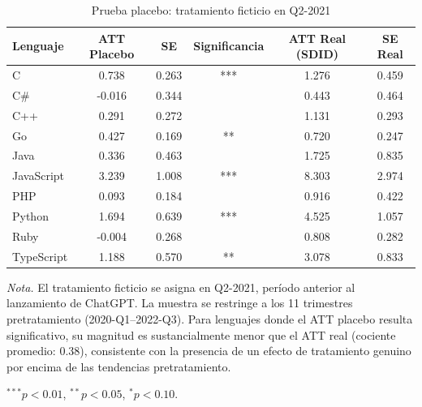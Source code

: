 \begin{table}[H]
\centering
\begin{threeparttable}
\caption{Prueba placebo: tratamiento ficticio en Q2-2021}
\label{tab:tabla5}
\begin{tabular}{lccccc}
\toprule
Lenguaje & ATT Placebo & SE & Significancia & ATT Real (SDID) & SE Real \\
\midrule
C & 0.738 & 0.263 & *** & 1.276 & 0.459 \\
C\# & -0.016 & 0.344 &  & 0.443 & 0.464 \\
C++ & 0.291 & 0.272 &  & 1.131 & 0.293 \\
Go & 0.427 & 0.169 & ** & 0.720 & 0.247 \\
Java & 0.336 & 0.463 &  & 1.725 & 0.835 \\
JavaScript & 3.239 & 1.008 & *** & 8.303 & 2.974 \\
PHP & 0.093 & 0.184 &  & 0.916 & 0.422 \\
Python & 1.694 & 0.639 & *** & 4.525 & 1.057 \\
Ruby & -0.004 & 0.268 &  & 0.808 & 0.282 \\
TypeScript & 1.188 & 0.570 & ** & 3.078 & 0.833 \\
\bottomrule
\end{tabular}
\begin{tablenotes}
\small
\item \textit{Nota.} El tratamiento ficticio se asigna en Q2-2021, período anterior al lanzamiento de ChatGPT. La muestra se restringe a los 11 trimestres pretratamiento (2020-Q1--2022-Q3). Para lenguajes donde el ATT placebo resulta significativo, su magnitud es sustancialmente menor que el ATT real (cociente promedio: 0.38), consistente con la presencia de un efecto de tratamiento genuino por encima de las tendencias pretratamiento.
\item $^{***}p<0.01$, $^{**}p<0.05$, $^{*}p<0.10$.
\end{tablenotes}
\end{threeparttable}
\end{table}
